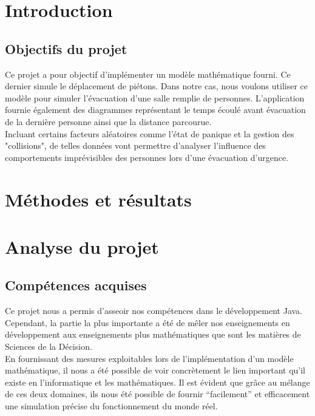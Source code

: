 \documentclass[twoside,UTF8]{EPURapport}
\begin{document}
\chapter{Introduction}
	\section{Objectifs du projet}
	Ce projet a pour objectif d'implémenter un modèle mathématique fourni. Ce dernier simule le déplacement de piétons. Dans notre cas, nous voulons utiliser ce modèle pour simuler l'évacuation d'une salle remplie de personnes. L'application fournie également des diagrammes représentant le temps écoulé avant évacuation de la dernière personne ainsi que la distance parcourue.\\
	Incluant certains facteurs aléatoires comme l'état de panique et la gestion des "collisions", de telles données vont permettre d'analyser l'influence des comportements imprévisibles des personnes lors d'une évacuation d'urgence.
	
\chapter{Méthodes et résultats}

	

	
	
	
		
\chapter{Analyse du projet}
	\section{Compétences acquises}
	Ce projet nous a permis d'asseoir nos compétences dans le développement Java. Cependant, la partie la plus importante a été de mêler nos enseignements en développement aux enseignements plus mathématiques que sont les matières de Sciences de la Décision.\\
	
	En fournissant des mesures exploitables lors de l'implémentation d'un modèle mathématique, il nous a été possible de voir concrètement le lien important qu'il existe en l'informatique et les mathématiques. Il est évident que grâce au mélange de ces deux domaines, ils nous été possible de fournir ``facilement'' et efficacement une simulation précise du fonctionnement du monde réel.
	
\end{document}
